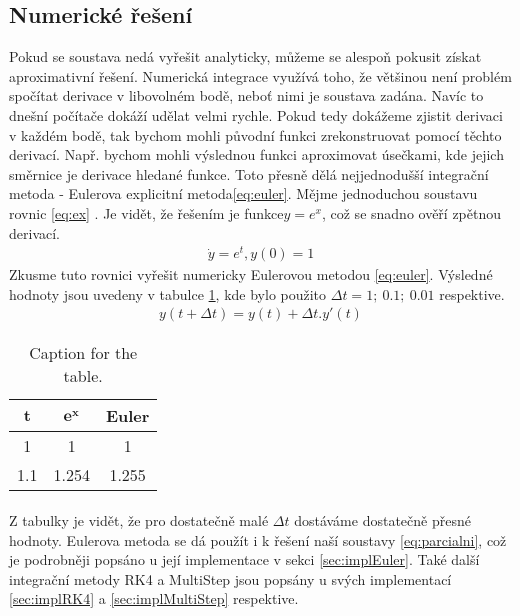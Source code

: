 \subsection{Numerické řešení}
Pokud se soustava nedá vyřešit analyticky, můžeme se alespoň pokusit získat aproximativní řešení. Numerická integrace využívá toho, že většinou není problém spočítat derivace v libovolném bodě, neboť nimi je soustava zadána. Navíc to dnešní počítače dokáží udělat velmi rychle. Pokud tedy dokážeme zjistit derivaci v každém bodě, tak bychom mohli původní funkci zrekonstruovat pomocí těchto derivací. Např. bychom mohli výslednou funkci aproximovat úsečkami, kde jejich směrnice je derivace hledané funkce. Toto přesně dělá nejjednodušší integrační metoda - Eulerova explicitní metoda\eqref{eq:euler}.
Mějme jednoduchou soustavu rovnic \eqref{eq:ex} . Je vidět, že řešením je funkce$ y=e^x $, což se snadno ověří zpětnou derivací. 
\begin{align} \label{eq:ex}
\dot	y = e^t, y(0)=1
\end{align}
Zkusme tuto rovnici vyřešit numericky Eulerovou metodou \eqref{eq:euler}. 
Výsledné hodnoty jsou uvedeny v tabulce \ref{tab:numer}, kde bylo použito $ \Delta t = 1;\> 0.1;\> 0.01$ respektive.
\begin{align} \label{eq:euler}
	y(t+\Delta t) = y(t) + \Delta t . y'(t)
\end{align}
\begin{table}[h!]
	\centering
	\label{tab:numer}
	\begin{tabular}{c||c|c}
	$ \boldsymbol t $ & $\boldsymbol{ e^x} $  &\textbf{	 Euler}\\
		
		\hline
		1 & 1 & 1\\
		1.1 & 1.254 & 1.255
	\end{tabular}
\caption{Caption for the table.}
\end{table}
\paragraph{}
Z tabulky je vidět, že pro dostatečně malé $ \Delta t$ dostáváme dostatečně přesné hodnoty.
Eulerova metoda se dá použít i k řešení naší soustavy \eqref{eq:parcialni}, což je podrobněji popsáno u její implementace v sekci \ref{sec:implEuler}. Také další integrační metody RK4 a MultiStep jsou popsány u svých implementací \ref{sec:implRK4} a \ref{sec:implMultiStep} respektive.











